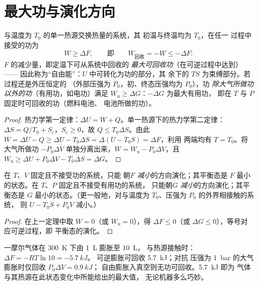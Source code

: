\section{最大功与演化方向}

\begin{theorem}[单热源过程]\label{thm:b2:thermodynamic-potentials:monothermal}
与温度为 $T_0$ 的单一热源交换热量的系统，其
初温与终温均为 $T_0$，在任一
过程中接受的功为
\[
W \ge \Delta F , \qquad\text{即}\qquad W_{\text{回收}} = -W \le -\Delta F :
\]
$F$ 的减少量，即定温下可从系统中回收的
\emph{最大可回收功}（在可逆过程中达到）——
因此称为“自由能”：$U$ 中可转化为功的部分，其
余下的 $TS$ 为束缚部分。若过程还是外压恒定的
（外部压强为 $P_0$，初、终态压强均为 $P_0$），功
\emph{除大气所做功以外的功}（有用功，如电功）满足
$W_{\text{u}} \ge \Delta G$：$-\Delta G$ 为最大有用功，
即在 $T$ 与 $P$ 固定时可回收的功（燃料电池、
电池所做的功）。
\end{theorem}

\begin{proof}
热力学第一定律：$\Delta U = W + Q$。单一热源下的热力学第二定律：$\Delta S
= Q/T_0 + S_{\text{c}}$，$S_{\text{c}} \ge 0$，故 $Q \le T_0\Delta S$。由此
$W = \Delta U - Q \ge \Delta U - T_0\Delta S = \Delta(U - T_0S) = \Delta F$，利用
两端均有 $T = T_0$。将大气所做功 $-P_0\Delta V$
单独分离出来，$W = W_{\text{u}} - P_0\Delta V$，且 $W_{\text{u}} \ge \Delta U + P_0
\Delta V - T_0\Delta S = \Delta G$。
\end{proof}

\begin{theorem}[演化与平衡判据]\label{thm:b2:thermodynamic-potentials:criteria}
在 $T$、$V$ 固定且不接受功的系统，只能
朝\emph{$F$ 减小}的方向演化；其平衡态是
$F$ 最小的状态。在 $T$、$P$ 固定且不接受有用功的系统，
只能朝\emph{$G$ 减小}的方向演化；其平衡态是
$G$ 最小的状态。（更一般地，对与温度为 $T_0$、压强为 $P_0$ 的外界相接触的系统，
则 $U - T_0S + P_0V$ 减小。）
\end{theorem}

\begin{proof}
在上一定理中取 $W = 0$（或 $W_{\text{u}} = 0$），得 $\Delta F
\le 0$（或 $\Delta G \le 0$），等号对应可逆过程，即
平衡态的演化。
\end{proof}

\begin{example}\label{ex:b2:thermodynamic-potentials:expansion}
一摩尔气体在 \qty{300}{K} 下由 \qty{1}{L} 膨胀至 \qty{10}{L}，
与热源接触时：$\Delta F = -RT\ln 10 = \qty{-5.7}{kJ}$。
可逆膨胀可回收 \qty{5.7}{kJ}；对抗
压强为 \qty{1}{bar} 的大气膨胀时仅回收 $P_0\Delta V = \qty{0.9}{kJ}$；
自由膨胀入真空则无功可回收。\qty{5.7}{kJ} 即为
气体与其热源在此状态变化中所能给出的最大值，
无论机器多么巧妙。
\end{example}

